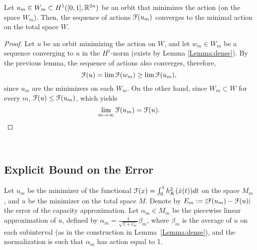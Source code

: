 \documentclass[../capacities_main.tex]{subfiles}
\begin{document}
\begin{Lemma}
	Let $u_m\in W_m\subset H^1([0,1],{\mathbb R}^{2n})$ be an orbit that minimizes the action (on the space $W_m$). Then, the sequence of actions ${\mathcal F}(u_m)$ converges to the minimal action on the total space $W$. 
\end{Lemma}

\begin{proof}
	Let $u$ be an orbit minimizing the action on $W$, and let $w_m\in W_m$ be a sequence converging to $u$ in the $H^1$-norm (exists by Lemma \autoref{Lemma:dense}). By the previous lemma, the sequence of actions also converges, therefore,
	\[
	{\mathcal F}(u)=\lim {\mathcal F}(w_m)\geq \lim {\mathcal F}(u_m),
	\]
	since $u_m$ are the minimizers on each $W_m$. On the other hand, since $W_m\subset W$ for every $m$, ${\mathcal F}(u)\leq {\mathcal F}(u_m)$, which yields 
	\[
	\lim_{m\rightarrow\infty}{\mathcal F}(u_m)={\mathcal F}(u).
	\]
\end{proof}\

\subsection{Explicit Bound on the Error}

Let $u_m$ be the minimizer of the functional ${\mathcal F}(x)=\int_0^1 h_K^2 (\dot x(t))dt$ on the space $M_m$, and $u$ be the minimizer on the total space $M$. Denote by $E_m:=|{\mathcal F} (u_m)-{\mathcal F}(u)|$ the error of the capacity approximation. Let $\alpha_m\in M_m$ be the piecewise linear approximation of $u$, defined by $\alpha_m=\frac{1}{\sqrt{1+c_m}}\beta_m$, where $\dot\beta_m$ is the average of $\dot u$ on each subinterval (as in the construction in Lemma~\ref{Lemma:dense}), and the normalization is such that $\alpha_m$ has action equal to 1.
\end{document}

